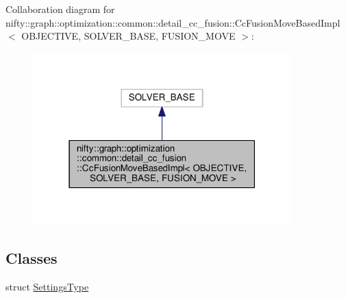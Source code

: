 Collaboration diagram for nifty\+:\+:graph\+:\+:optimization\+:\+:common\+:\+:detail\+\_\+cc\+\_\+fusion\+:\+:Cc\+Fusion\+Move\+Based\+Impl$<$ O\+B\+J\+E\+C\+T\+I\+V\+E, S\+O\+L\+V\+E\+R\+\_\+\+B\+A\+S\+E, F\+U\+S\+I\+O\+N\+\_\+\+M\+O\+V\+E $>$\+:\nopagebreak
\begin{figure}[H]
\begin{center}
\leavevmode
\includegraphics[width=283pt]{classnifty_1_1graph_1_1optimization_1_1common_1_1detail__cc__fusion_1_1CcFusionMoveBasedImpl__coll__graph}
\end{center}
\end{figure}
\subsection*{Classes}
\begin{DoxyCompactItemize}
\item 
struct \hyperlink{structnifty_1_1graph_1_1optimization_1_1common_1_1detail__cc__fusion_1_1CcFusionMoveBasedImpl_1_1SettingsType}{Settings\+Type}
\end{DoxyCompactItemize}
